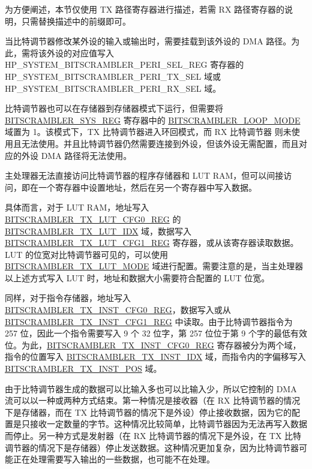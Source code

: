 \documentclass[main\_\_CN.tex]{subfiles}
\begin{document}
\begin{tiplisting}
为方便阐述，本节仅使用 TX 路径寄存器进行描述，若需 RX 路径寄存器的说明，只需替换描述中的前缀即可。
\end{tiplisting}

当比特调节器修改某外设的输入或输出时，需要挂载到该外设的 DMA 路径。为此，需将该外设的对应值写入 HP\_SYSTEM\_BITSCRAMBLER\_PERI\_SEL\_REG 寄存器的HP\_SYSTEM\_BITSCRAMBLER\_PERI\_TX\_SEL 域或 HP\_SYSTEM\_BITSCRAMBLER\_PERI\_RX\_SEL 域。

比特调节器也可以在存储器到存储器模式下运行，但需要将 \hyperref[regdesc:BITSCRAMBLERSYSREG]{BITSCRAMBLER\_SYS\_REG} 寄存器中的 \hyperref[fielddesc:BITSCRAMBLERLOOPMODE]{BITSCRAMBLER\_LOOP\_MODE} 域置为 1。该模式下，TX 比特调节器进入环回模式，而 RX 比特调节器 则未使用且无法使用。并且比特调节器仍然需要连接到外设，但该外设无需配置，而且对应的外设 DMA 路径将无法使用。

主处理器无法直接访问比特调节器的程序存储器和 LUT RAM，但可以间接访问，即在一个寄存器中设置地址，然后在另一个寄存器中写入数据。

具体而言，对于 LUT RAM，地址写入 \hyperref[regdesc:BITSCRAMBLERTXLUTCFG0REG]{BITSCRAMBLER\_TX\_LUT\_CFG0\_REG} 的 \hyperref[fielddesc:BITSCRAMBLERTXLUTIDX]{BITSCRAMBLER\_TX\_LUT\_IDX} 域，数据写入 \hyperref[regdesc:BITSCRAMBLERTXLUTCFG1REG]{BITSCRAMBLER\_TX\_LUT\_CFG1\_REG} 寄存器，或从该寄存器读取数据。LUT 的位宽对比特调节器可见的，可以使用 \hyperref[fielddesc:BITSCRAMBLERTXLUTMODE]{BITSCRAMBLER\_TX\_LUT\_MODE} 域进行配置。需要注意的是，当主处理器以上述方式写入 LUT 时，地址和数据大小需要符合配置的 LUT 位宽。


同样，对于指令存储器，地址写入 \hyperref[regdesc:BITSCRAMBLERTXINSTCFG0REG]{BITSCRAMBLER\_TX\_INST\_CFG0\_REG}，数据写入或从 \hyperref[regdesc:BITSCRAMBLERTXINSTCFG1REG]{BITSCRAMBLER\_TX\_INST\_CFG1\_REG} 中读取。由于比特调节器指令为 257 位，因此一个指令需要写入 9 个 32 位字，第 257 位位于第 9 个字的最低有效位。为此，\hyperref[regdesc:BITSCRAMBLERTXINSTCFG0REG]{BITSCRAMBLER\_TX\_INST\_CFG0\_REG} 寄存器被分为两个域，指令的位置写入 \hyperref[fielddesc:BITSCRAMBLERTXINSTIDX]{BITSCRAMBLER\_TX\_INST\_IDX} 域，而指令内的字偏移写入 \hyperref[fielddesc:BITSCRAMBLERTXINSTPOS]{BITSCRAMBLER\_TX\_INST\_POS} 域。


由于比特调节器生成的数据可以比输入多也可以比输入少，所以它控制的 DMA 流可以以一种或两种方式结束。第一种情况是接收器（在 RX 比特调节器的情况下是存储器，而在 TX 比特调节器的情况下是外设）停止接收数据，因为它的配置是只接收一定数量的字节。这种情况比较简单，比特调节器因为无法再写入数据而停止。另一种方式是发射器（在 RX 比特调节器的情况下是外设，在 TX 比特调节器的情况下是存储器）停止发送数据。这种情况更加复杂，因为比特调节器可能正在处理需要写入输出的一些数据，也可能不在处理。
\end{document}
